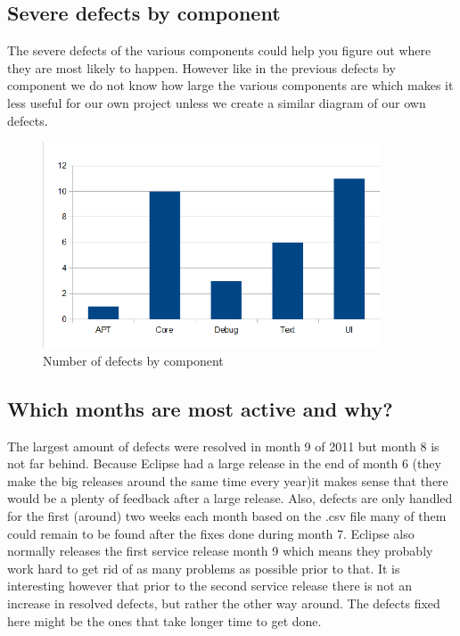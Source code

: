 \documentclass{article}
\begin{document}
\subsection{Severe defects by component}
The severe defects of the various components could help you figure out where they are most likely to happen.
However like in the previous defects by component we do not know how large the various components are which makes it less useful for our own project unless we create a similar diagram of our own defects.
\begin{figure}[H]
\center
\includegraphics[width=100mm]{severe_defects_per_component.png}
\caption{Number of defects by component}
\end{figure}

\subsection{Which months are most active and why?}
The largest amount of defects were resolved in month 9 of 2011 but month 8 is not far behind. 
Because Eclipse had a large release in the end of month 6 (they make the big releases around the same time every year)it makes sense that there would be a plenty of feedback after a large release.
Also, defects are only handled for the first (around) two weeks each month based on the .csv file many of them could remain to be found after the fixes done during month 7.
Eclipse also normally releases the first service release month 9 which means they probably work hard to get rid of as many problems as possible prior to that.
It is interesting however that prior to the second service release there is not an increase in resolved defects, but rather the other way around. The defects fixed here might be the ones that take longer time to get done.

\end{document}
